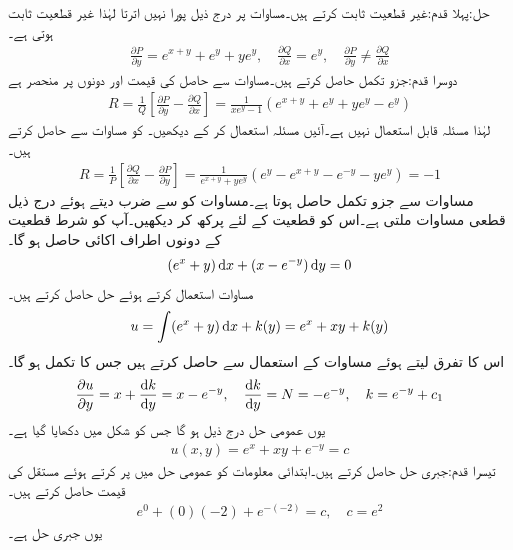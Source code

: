 حل:پہلا قدم:غیر قطعیت ثابت کرتے ہیں۔مساوات  پر درج ذیل پورا نہیں اترتا لہٰذا غیر قطعیت ثابت ہوتی ہے۔
\begin{align*}
\frac{\partial P}{\partial y}=e^{x+y}+e^y+ye^y,\quad \frac{\partial Q}{\partial x}=e^y, \quad \frac{\partial P}{\partial y}\ne  \frac{\partial Q}{\partial x}
\end{align*} 
دوسرا قدم:جزو تکمل حاصل کرتے ہیں۔مساوات  سے حاصل  کی قیمت  اور  دونوں پر منحصر ہے 
\begin{align*}
R=\frac{1}{Q}\left[ \frac{\partial P}{\partial y}-\frac{\partial Q}{\partial x}\right]=\frac{1}{xe^y-1}(e^{x+y}+e^y+ye^y-e^y)
\end{align*}
لہٰذا مسئلہ  قابل استعمال نہیں ہے۔آئیں مسئلہ  استعمال کر کے دیکھیں۔  کو مساوات  سے حاصل کرتے ہیں۔
\begin{align*}
R=\frac{1}{P}\left[ \frac{\partial Q}{\partial x}-\frac{\partial P}{\partial y}\right]=\frac{1}{e^{x+y}+ye^y}(e^y-e^{x+y}-e^{-y}-ye^y)=-1
\end{align*}
مساوات  سے جزو تکمل  حاصل ہوتا ہے۔مساوات  کو  سے ضرب دیتے ہوئے  درج ذیل قطعی مساوات ملتی ہے۔اس کو قطعیت کے لئے پرکھ کر دیکھیں۔آپ کو شرط قطعیت کے دونوں اطراف اکائی حاصل ہو گا۔
\begin{align*}
(e^{x}+y)\dif x+(x-e^{-y})\dif y=0
\end{align*}
مساوات  استعمال کرتے ہوئے حل حاصل کرتے ہیں۔
\begin{align*}
u=\int (e^{x}+y) \dif x+k(y)=e^x+xy+k(y)
\end{align*}
اس کا  تفرق لیتے ہوئے مساوات  کے استعمال سے  حاصل کرتے ہیں جس کا تکمل  ہو گا۔
\begin{align*}
\frac{\partial u}{\partial y}=x+\frac{\dif k}{\dif y}=x-e^{-y}, \quad \frac{\dif k}{\dif y}=N=-e^{-y}, \quad k=e^{-y}+c_1
\end{align*}
یوں عمومی حل درج ذیل ہو گا جس کو شکل  میں دکھایا گیا ہے۔
\begin{align}
u(x,y)=e^x+xy+e^{-y}=c
\end{align}
تیسرا قدم:جبری حل حاصل کرتے ہیں۔ابتدائی معلومات  کو عمومی حل میں پر کرتے ہوئے مستقل کی قیمت حاصل کرتے ہیں۔
\begin{align*}
e^0+(0)(-2)+e^{-(-2)}=c, \quad c=e^2
\end{align*}
یوں جبری حل  ہے۔

